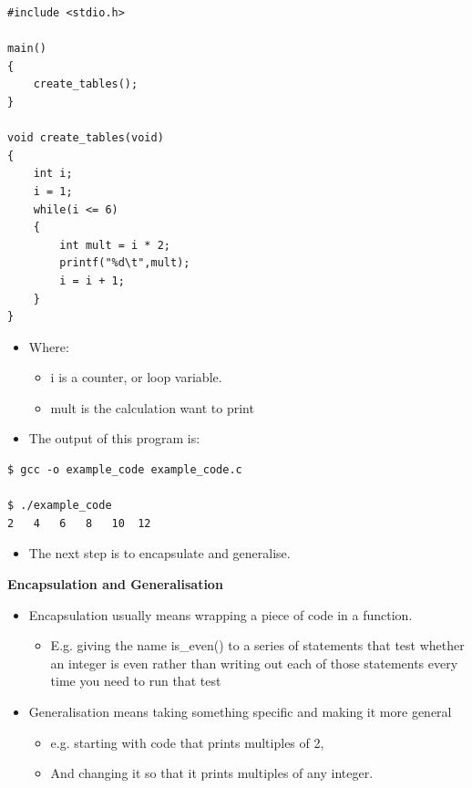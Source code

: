 \documentclass{beamer}
\begin{document}
\begin{frame}[fragile] 
\begin{block}{}
\begin{lstlisting}
#include <stdio.h>

main() 
{
    create_tables();
}

void create_tables(void)
{
    int i;
    i = 1;
    while(i <= 6)
    {
        int mult = i * 2;
        printf("%d\t",mult);
        i = i + 1;
    }
}
\end{lstlisting}
\end{block}
\end{frame}


\begin{frame}[fragile] 
\begin{itemize}
\item Where:
\begin{itemize}
\item i is a counter, or loop variable. 
\item mult is the calculation want to print
\end{itemize}
\item The output of this program is:
\end{itemize}

\begin{block}{}
\begin{lstlisting}
$ gcc -o example_code example_code.c

$ ./example_code
2	4	6	8	10	12
\end{lstlisting}
\end{block}

\begin{itemize}
\item The next step is to encapsulate and generalise.  
\end{itemize}
\end{frame}

\begin{frame} 
\begin{center}
\textbf{Encapsulation and Generalisation}
\end{center}

\begin{itemize}
\item Encapsulation usually means wrapping a piece of code in a function.
\begin{itemize}
\item E.g. giving the name is\_even() to a series of statements that test whether an integer is even rather than writing
out each of those statements every time you need to run that test
\end{itemize}
\item Generalisation means taking something specific and making it more general
\begin{itemize}
\item e.g. starting with code that prints multiples of 2,
\item And changing it so that it prints multiples of any integer.
\end{itemize}
\end{itemize}

\end{frame}
\end{document}
